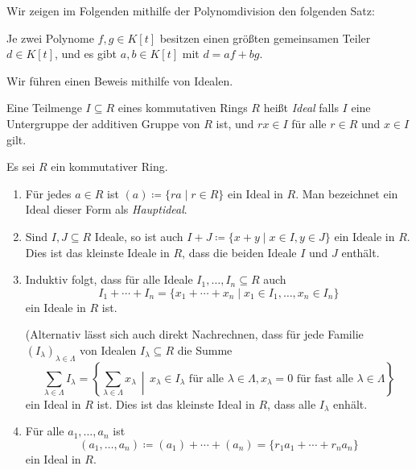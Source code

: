 Wir zeigen im Folgenden mithilfe der Polynomdivision den folgenden Satz:


\begin{theorem}
  \label{theorem: existence of greatest common divisors}
  Je zwei Polynome $f, g \in K[t]$ besitzen einen größten gemeinsamen Teiler $d \in K[t]$, und es gibt $a, b \in K[t]$ mit $d = af + bg$.
\end{theorem}


Wir führen einen Beweis mithilfe von Idealen.


\begin{definition}
  Eine Teilmenge $I \subseteq R$ eines kommutativen Rings $R$ heißt \emph{Ideal} falls $I$ eine Untergruppe der additiven Gruppe von $R$ ist, und $rx \in I$ für alle $r \in R$ und $x \in I$ gilt.
\end{definition}


\begin{example}
  Es sei $R$ ein kommutativer Ring.
  \begin{enumerate}
    \item
      Für jedes $a \in R$ ist $(a) \coloneqq \{ra \mid r \in R\}$ ein Ideal in $R$.
      Man bezeichnet ein Ideal dieser Form als \emph{Hauptideal}.
    \item
      Sind $I, J \subseteq R$ Ideale, so ist auch $I + J \coloneqq \{x + y \mid x \in I, y \in J\}$ ein Ideale in $R$.
      Dies ist das kleinste Ideale in $R$, dass die beiden Ideale $I$ und $J$ enthält.
    \item
      Induktiv folgt, dass für alle Ideale $I_1, \dotsc, I_n \subseteq R$ auch
      \[
          I_1 + \dotsb + I_n
        = \{ x_1 + \dotsb + x_n \mid x_1 \in I_1, \dotsc, x_n \in I_n \}
      \]
      ein Ideale in $R$ ist.
      
      (Alternativ lässt sich auch direkt Nachrechnen, dass für jede Familie $(I_\lambda)_{\lambda \in \Lambda}$ von Idealen $I_\lambda \subseteq R$ die Summe
      \[
          \sum_{\lambda \in \Lambda} I_\lambda
        = \left\{
            \sum_{\lambda \in \Lambda} x_\lambda
          \,\middle|\,
            \text{$x_\lambda \in I_\lambda$ für alle $\lambda \in \Lambda$},
            \text{$x_\lambda = 0$ für fast alle $\lambda \in \Lambda$}
          \right\}
      \]
      ein Ideal in $R$ ist.
      Dies ist das kleinste Ideal in $R$, dass alle $I_\lambda$ enhält.
    \item
      Für alle $a_1, \dotsc, a_n$ ist
      \[
                  (a_1, \dotsc, a_n)
        \coloneqq (a_1) + \dotsb + (a_n)
        =         \{ r_1 a_1 + \dotsb + r_n a_n \}
      \]
      ein Ideal in $R$.
  \end{enumerate}
\end{example}


